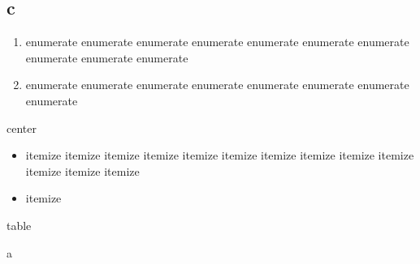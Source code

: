 \documentclass[journal]{IEEEtran}
\begin{document}
\subsection{c}
\begin{enumerate}[itemindent=2em]
    \item enumerate enumerate enumerate enumerate enumerate enumerate enumerate enumerate enumerate enumerate
    \item enumerate enumerate enumerate enumerate enumerate enumerate enumerate  enumerate
\end{enumerate}

\begin{center}
  center
\end{center}

\begin{itemize}
  \item itemize itemize itemize itemize itemize itemize itemize itemize itemize itemize itemize itemize itemize
  \item itemize
\end{itemize}

\begin{table}
  \centering
  table
  \caption{a}\label{a}
\end{table}



\end{document}
